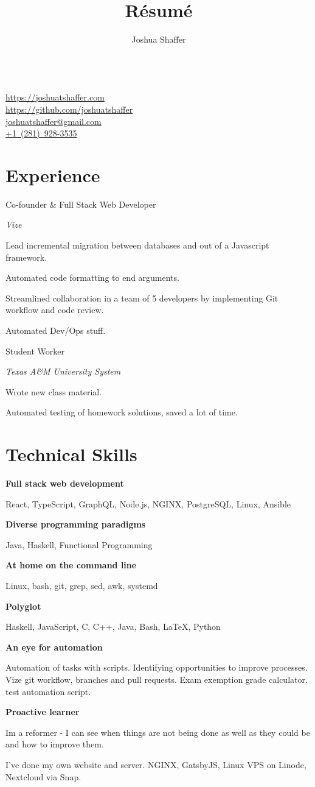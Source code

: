\documentclass{article}
\title{R\'esum\'e}
\author{Joshua Shaffer}
\newcommand{\jskill}[2]{
\noindent
\begin{minipage}[t]{.15\textwidth}
\raggedleft{#1}
\end{minipage}
\hspace{.1em}
\begin{minipage}[t]{.80\textwidth}
#2
\end{minipage}

\vspace{0.75em}}
\newcommand{\entry}[4]{
\jskill{#1}{#2

\textit{#3}

\footnotesize{#4}}
}
\begin{document}
\begin{center}
    \mbox{\huge\bfseries\theauthor} \\
    \mbox{\href{https://joshuatshaffer.com}{https://joshuatshaffer.com}} \\
    \mbox{\href{https://github.com/joshuatshaffer}{https://github.com/joshuatshaffer}} \\
    \mbox{\href{mailto:joshuatshaffer@gmail.com}{joshuatshaffer@gmail.com}} \\
    \mbox{\href{tel:+12819283535}{+1 (281) 928-3535}}
\end{center}

\section{Experience}

\entry
{2018--Present}
{Co-founder \& Full Stack Web Developer}
{Vize}
{Lead incremental migration between databases and out of a Javascript framework.

    Automated code formatting to end arguments.

    Streamlined collaboration in a team of 5 developers by implementing Git workflow and code review.

    Automated Dev/Ops stuff.
}

\entry
{2017-2018ish}
{Student Worker}
{Texas A\&M University System}
{Wrote new class material.

    Automated testing of homework solutions, saved a lot of time.}

\section{Technical Skills}

 {\centering

  \textbf{Full stack web development}

  React, TypeScript, GraphQL, Node.js, NGINX, PostgreSQL, Linux, Ansible

  \textbf{Diverse programming paradigms}

  Java, Haskell, Functional Programming

  \textbf{At home on the command line}

  Linux, bash, git, grep, sed, awk, systemd

  \textbf{Polyglot}

  Haskell, JavaScript, C, C++, Java, Bash, LaTeX, Python

  \textbf{An eye for automation}

  Automation of tasks with scripts. Identifying opportunities to improve processes. Vize git
  workflow, branches and pull requests. Exam exemption grade calculator. test automation
  script.

  \textbf{Proactive learner}

  Im a reformer - I can see when things are not being done as well as they could be and how to improve them.

  I've done my own website and server. NGINX, GatsbyJS, Linux VPS on Linode, Nextcloud via Snap.
 }
\end{document}
